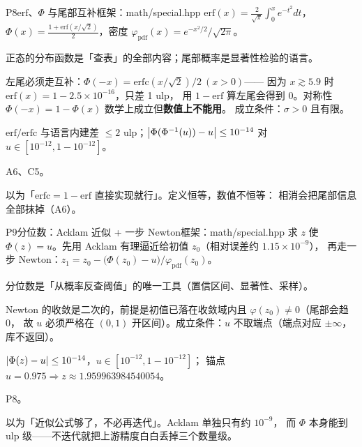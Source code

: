 \begin{know}{P8}{$\mathrm{erf}$、$\Phi$ 与尾部互补}{框架：math/special.hpp}
 $\mathrm{erf}(x)=\frac{2}{\sqrt\pi}\int_0^{x}e^{-t^{2}}dt$，
$\Phi(x)=\frac{1+\mathrm{erf}(x/\sqrt2)}{2}$，密度 $\varphi_{\text{pdf}}(x)=e^{-x^{2}/2}/\sqrt{2\pi}$。

 正态的分布函数是「查表」的全部内容；尾部概率是显著性检验的语言。

 左尾必须走互补：$\Phi(-x)=\mathrm{erfc}(x/\sqrt2)/2\ (x>0)$——
因为 $x\gtrsim5.9$ 时 $\mathrm{erf}(x)=1-2.5\times10^{-16}$，只差 1 ulp，
用 $1-\mathrm{erf}$ 算左尾会得到 0。对称性 $\Phi(-x)=1-\Phi(x)$ 数学上成立但\textbf{数值上不能用}。
成立条件：$\sigma>0$ 且有限。

 $\mathrm{erf}/\mathrm{erfc}$ 与语言内建差 $\le2$ ulp；$\left\lvert \Phi(\Phi^{-1}(u))-u\right\rvert\le10^{-14}$
对 $u\in[10^{-12},1-10^{-12}]$。

 A6、C5。

 以为「$\mathrm{erfc}=1-\mathrm{erf}$ 直接实现就行」。定义恒等，数值不恒等：
相消会把尾部信息全部抹掉（A6）。
\end{know}

\begin{know}{P9}{分位数：Acklam 近似 + 一步 Newton}{框架：math/special.hpp}
 求 $z$ 使 $\Phi(z)=u$。先用 Acklam 有理逼近给初值 $z_0$（相对误差约 $1.15\times10^{-9}$），
再走一步 Newton：$z_1=z_0-\big(\Phi(z_0)-u\big)/\varphi_{\text{pdf}}(z_0)$。

 分位数是「从概率反查阈值」的唯一工具（置信区间、显著性、采样）。

 Newton 的收敛是二次的，前提是初值已落在收敛域内且 $\varphi(z_0)\ne0$（尾部会趋 0，
故 $u$ 必须严格在 $(0,1)$ 开区间）。成立条件：$u$ 不取端点（端点对应 $\pm\infty$，库不返回）。

 $\left\lvert \Phi(z)-u\right\rvert\le10^{-14}$，$u\in[10^{-12},1-10^{-12}]$；
锚点 $u=0.975\Rightarrow z\approx1.959963984540054$。

 P8。

 以为「近似公式够了，不必再迭代」。Acklam 单独只有约 $10^{-9}$，
而 $\Phi$ 本身能到 ulp 级——不迭代就把上游精度白白丢掉三个数量级。
\end{know}

